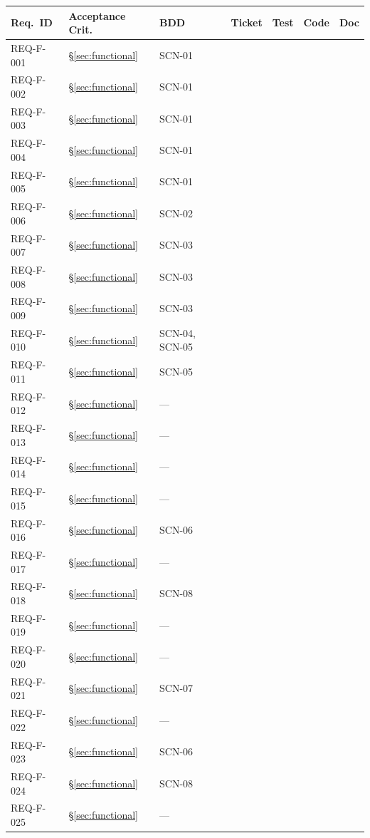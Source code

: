 \documentclass[11pt,a4paper]{article}
\begin{document}
\begin{longtable}{L{1.7cm}L{2.3cm}L{1.6cm}L{1.4cm}L{1.4cm}L{1.4cm}L{1.4cm}}
\toprule
Req.\ ID & Acceptance Crit. & BDD & Ticket & Test & Code & Doc \\
\midrule
\endhead
REQ-F-001 & \S\ref{sec:functional} & SCN-01 & & & & \\
REQ-F-002 & \S\ref{sec:functional} & SCN-01 & & & & \\
REQ-F-003 & \S\ref{sec:functional} & SCN-01 & & & & \\
REQ-F-004 & \S\ref{sec:functional} & SCN-01 & & & & \\
REQ-F-005 & \S\ref{sec:functional} & SCN-01 & & & & \\
REQ-F-006 & \S\ref{sec:functional} & SCN-02 & & & & \\
REQ-F-007 & \S\ref{sec:functional} & SCN-03 & & & & \\
REQ-F-008 & \S\ref{sec:functional} & SCN-03 & & & & \\
REQ-F-009 & \S\ref{sec:functional} & SCN-03 & & & & \\
REQ-F-010 & \S\ref{sec:functional} & SCN-04, SCN-05 & & & & \\
REQ-F-011 & \S\ref{sec:functional} & SCN-05 & & & & \\
REQ-F-012 & \S\ref{sec:functional} & --- & & & & \\
REQ-F-013 & \S\ref{sec:functional} & --- & & & & \\
REQ-F-014 & \S\ref{sec:functional} & --- & & & & \\
REQ-F-015 & \S\ref{sec:functional} & --- & & & & \\
REQ-F-016 & \S\ref{sec:functional} & SCN-06 & & & & \\
REQ-F-017 & \S\ref{sec:functional} & --- & & & & \\
REQ-F-018 & \S\ref{sec:functional} & SCN-08 & & & & \\
REQ-F-019 & \S\ref{sec:functional} & --- & & & & \\
REQ-F-020 & \S\ref{sec:functional} & --- & & & & \\
REQ-F-021 & \S\ref{sec:functional} & SCN-07 & & & & \\
REQ-F-022 & \S\ref{sec:functional} & --- & & & & \\
REQ-F-023 & \S\ref{sec:functional} & SCN-06 & & & & \\
REQ-F-024 & \S\ref{sec:functional} & SCN-08 & & & & \\
REQ-F-025 & \S\ref{sec:functional} & --- & & & & \\

\end{longtable}
\end{document}
